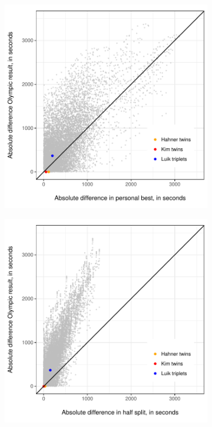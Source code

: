 \documentclass[12pt,titlepage]{article}
\begin{document}
\begin{figure}[!ht]
 \caption{Differences in personal best times and finishing times}
  \label{fig:diffdiff}
 \centering
 \begin{subfigure}{.49\textwidth}
 \includegraphics[width=\textwidth, keepaspectratio]{diff_in_diff_scatter_plot.pdf}
 \caption{}
  \label{fig:diffdiffscatter}
 \end{subfigure}
  \begin{subfigure}{.49\textwidth}
 \includegraphics[width=\textwidth, keepaspectratio]{diff_in_diff_scatter_plot_half.pdf}
 \caption{}
  \label{fig:diffdiffscatterhalf}
 \end{subfigure}
\end{figure}
\end{document}
